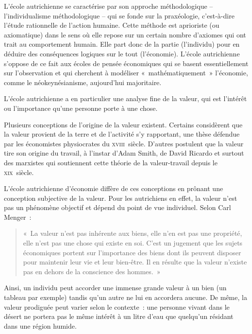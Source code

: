L'école autrichienne se caractérise par son approche méthodologique -- l'individualisme méthodologique -- qui se fonde sur la praxéologie, c'est-à-dire l'étude rationnelle de l'action humaine. Cette méthode est aprioriste (ou axiomatique) dans le sens où elle repose sur un certain nombre d'axiomes qui ont trait au comportement humain. Elle part donc de la partie (l'individu) pour en déduire des conséquences logiques sur le tout (l'économie). L'école autrichienne s'oppose de ce fait aux écoles de pensée économiques qui se basent essentiellement sur l'observation et qui cherchent à modéliser «~mathématiquement~» l'économie, comme le néokeynésianisme, aujourd'hui majoritaire.


L'école autrichienne a en particulier une analyse fine de la valeur, qui est l'intérêt ou l'importance qu'une personne porte à une chose.

Plusieurs conceptions de l'origine de la valeur existent. Certains considèrent que la valeur provient de la terre et de l'activité s'y rapportant, une thèse défendue par les économistes physiocrates du \textsc{xviii}\ieme{}~siècle. D'autres postulent que la valeur tire son origine du travail, à l'instar d'Adam Smith, de David Ricardo et surtout des marxistes qui soutiennent cette théorie de la valeur-travail depuis le \textsc{xix}\ieme{}~siècle.

L'école autrichienne d'économie diffère de ces conceptions en prônant une conception subjective de la valeur. Pour les autrichiens en effet, la valeur n'est pas un phénomène objectif et dépend du point de vue individuel. Selon Carl Menger~: 

\begin{quote}
«~La valeur n'est pas inhérente aux biens, elle n'en est pas une propriété, elle n'est pas une chose qui existe en soi. C'est un jugement que les sujets économiques portent sur l'importance des biens dont ils peuvent disposer pour maintenir leur vie et leur bien-être. Il en résulte que la valeur n'existe pas en dehors de la conscience des hommes.~»
\end{quote}

Ainsi, un individu peut accorder une immense grande valeur à un bien (un tableau par exemple) tandis qu'un autre ne lui en accordera aucune. De même, la valeur prodiguée peut varier selon le contexte~: une personne vivant dans le désert ne portera pas le même intérêt à un litre d'eau que quelqu'un résidant dans une région humide.

